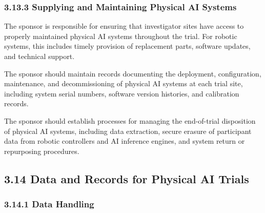 \documentclass[11pt]{article}
\begin{document}
\subsubsection{3.13.3 Supplying and Maintaining Physical AI Systems}

\begin{description}[leftmargin=2.5cm,style=sameline]

\item[(a)] The sponsor is responsible for ensuring that investigator sites have access to properly maintained physical AI systems throughout the trial. For robotic systems, this includes timely provision of replacement parts, software updates, and technical support.

\item[(b)] The sponsor should maintain records documenting the deployment, configuration, maintenance, and decommissioning of physical AI systems at each trial site, including system serial numbers, software version histories, and calibration records.

\item[(c)] The sponsor should establish processes for managing the end-of-trial disposition of physical AI systems, including data extraction, secure erasure of participant data from robotic controllers and AI inference engines, and system return or repurposing procedures.

\end{description}

\subsection{3.14 Data and Records for Physical AI Trials}

\subsubsection{3.14.1 Data Handling}
\end{document}

